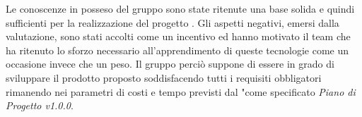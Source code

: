Le conoscenze in posseso del gruppo \GRUPPO{} sono state ritenute una base solida e quindi sufficienti per la realizzazione del progetto \PROGETTO.
Gli aspetti negativi, emersi dalla valutazione, sono stati accolti come un incentivo ed hanno motivato il team che ha ritenuto lo sforzo necessario all’apprendimento di queste tecnologie come un occasione invece che un peso.
Il gruppo perciò suppone di essere in grado di sviluppare il prodotto proposto soddisfacendo tutti i requisiti obbligatori rimanendo nei parametri di costi e tempo previsti dal "come specificato \textit{Piano di Progetto v1.0.0}.
